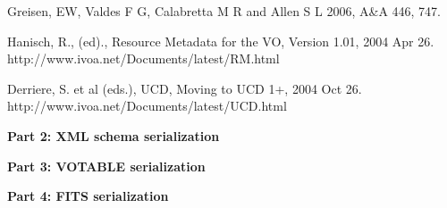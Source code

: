 \documentclass[11pt]{article}
\newcommand{\htpart}[1]{\centerline{\bf #1}}
\begin{document}
Greisen, EW, Valdes F G, Calabretta M R and Allen S L 2006,
A\&A 446, 747.\\
\vskip 0.1in
\par\noindent
Hanisch, R., (ed)., Resource Metadata for the VO, Version 1.01,
2004 Apr 26.  \\
http://www.ivoa.net/Documents/latest/RM.html

\vskip 0.1in
\par\noindent
Derriere, S. et al (eds.), UCD, Moving to UCD 1+, 2004 Oct 26.
\\
http://www.ivoa.net/Documents/latest/UCD.html


\clearpage





{\Large
\vfill
\htpart{Part 2: XML schema serialization}
\vfill
}


\clearpage




\clearpage



{\Large
\vfill
\vskip 5.0in
\htpart{Part 3: VOTABLE serialization}
\vfill
}

\clearpage

\clearpage




{\Large
\vfill
\vskip 5.0in
\htpart{Part 4: FITS serialization}
\vfill
}

\clearpage

\end{document}
